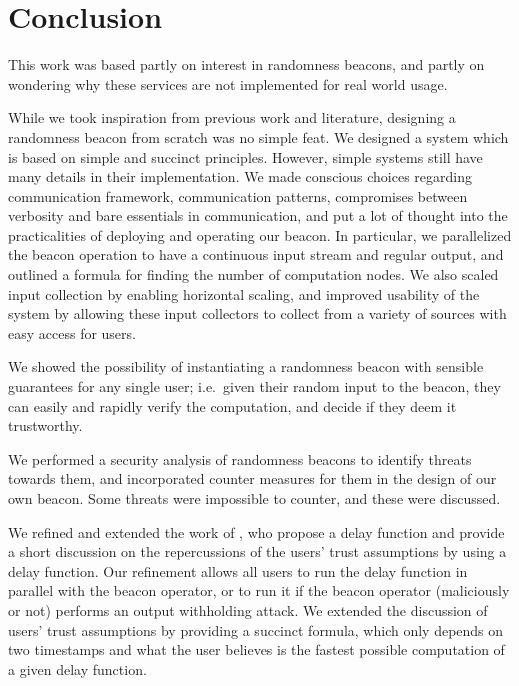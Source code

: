 \section{Conclusion}%
\label{sec:conclusion}

This work was based partly on interest in randomness beacons, and partly on wondering why these services are not implemented for real world usage.

While we took inspiration from previous work and literature, designing a randomness beacon from scratch was no simple feat.
We designed a system which is based on simple and succinct principles.
However, simple systems still have many details in their implementation.
We made conscious choices regarding communication framework, communication patterns, compromises between verbosity and bare essentials in communication, and put a lot of thought into the practicalities of deploying and operating our beacon.
In particular, we parallelized the beacon operation to have a continuous input stream and regular output, and outlined a formula for finding the number of computation nodes.
We also scaled input collection by enabling horizontal scaling, and improved usability of the system by allowing these input collectors to collect from a variety of sources with easy access for users.

We showed the possibility of instantiating a randomness beacon with sensible guarantees for any single user; i.e.\ given their random input to the beacon, they can easily and rapidly verify the computation, and decide if they deem it trustworthy.

We performed a security analysis of randomness beacons to identify threats towards them, and incorporated counter measures for them in the design of our own beacon.
Some threats were impossible to counter, and these were discussed.

We refined and extended the work of \citet{randomzoo}, who propose a delay function and provide a short discussion on the repercussions of the users' trust assumptions by using a delay function.
Our refinement allows all users to run the delay function in parallel with the beacon operator, or to run it if the beacon operator (maliciously or not) performs an output withholding attack.
We extended the discussion of users' trust assumptions by providing a succinct formula, which only depends on two timestamps and what the user believes is the fastest possible computation of a given delay function.

